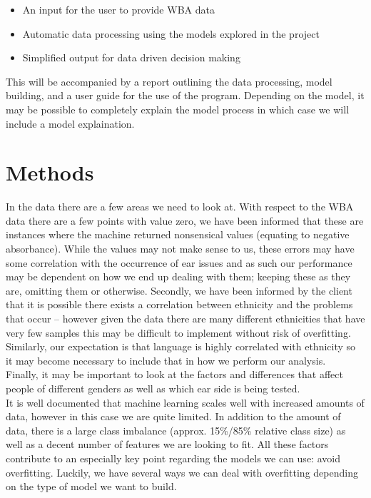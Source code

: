 \documentclass[11pt,a4paper]{article}
\begin{document}
\begin{itemize}
\item An input for the user to provide WBA data 
\item Automatic data processing using the models explored in the project 
\item Simplified output for data driven decision making 
\end{itemize}

This will be accompanied by a report outlining the data processing, model building, and a user guide for the use of the program. Depending on the model, it may be possible to completely explain the model process in which case we will include a model explaination.


\section*{Methods}

In the data there are a few areas we need to look at. With respect to the WBA data there are a few points with value zero, we have been informed that these are instances where the machine returned nonsensical values (equating to negative absorbance). While the values may not make sense to us, these errors may have some correlation with the occurrence of ear issues and as such our performance may be dependent on how we end up dealing with them; keeping these as they are, omitting them or otherwise. Secondly, we have been informed by the client that it is possible there exists a correlation between ethnicity and the problems that occur – however given the data there are many different ethnicities that have very few samples this may be difficult to implement without risk of overfitting. Similarly, our expectation is that language is highly correlated with ethnicity so it may become necessary to include that in how we perform our analysis. \\

Finally, it may be important to look at the factors and differences that affect people of different genders as well as which ear side is being tested. \\

It is well documented that machine learning scales well with increased amounts of data, however in this case we are quite limited. In addition to the amount of data, there is a large class imbalance (approx. 15\%/85\% relative class size) as well as a decent number of features we are looking to fit. All these factors contribute to an especially key point regarding the models we can use: avoid overfitting. Luckily, we have several ways we can deal with overfitting depending on the type of model we want to build.  \\
\end{document}
